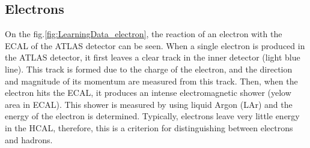 \subsection{Electrons}
\label{subsec:Electrons_disp}
On the fig.\ref{fig:LearningData_electron}, the reaction of an electron with the ECAL of the ATLAS detector can be seen. When a single electron is produced in the ATLAS detector, it first leaves a clear track in the inner detector (light blue line). This track is formed due to the charge of the electron, and the direction and magnitude of its momentum are measured from this track. Then, when the electron hits the ECAL, it produces an intense electromagnetic shower (yelow area in ECAL). This shower is measured by using liquid Argon (LAr) and the energy of the electron is determined. Typically, electrons leave very little energy in the HCAL, therefore, this is a criterion for distinguishing between electrons and hadrons.

